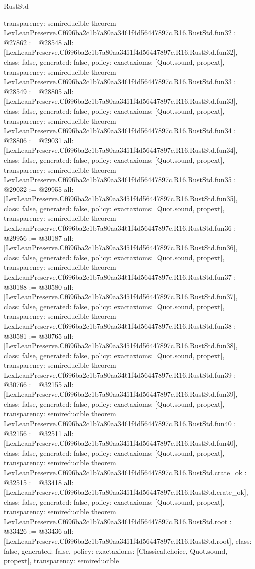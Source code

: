 \begin{lexlean}{RustStd}
\begin{coremodule}
{  transparency: semireducible
}
theorem LexLeanPreserve.Cf696ba2c1b7a80aa3461f4d56447897c.R16.RustStd.fun32 : @27862 := @28548 {
  all: [LexLeanPreserve.Cf696ba2c1b7a80aa3461f4d56447897c.R16.RustStd.fun32],
  class: false,
  generated: false,
  policy: exact{axioms: [Quot.sound, propext]},
  transparency: semireducible
}
theorem LexLeanPreserve.Cf696ba2c1b7a80aa3461f4d56447897c.R16.RustStd.fun33 : @28549 := @28805 {
  all: [LexLeanPreserve.Cf696ba2c1b7a80aa3461f4d56447897c.R16.RustStd.fun33],
  class: false,
  generated: false,
  policy: exact{axioms: [Quot.sound, propext]},
  transparency: semireducible
}
theorem LexLeanPreserve.Cf696ba2c1b7a80aa3461f4d56447897c.R16.RustStd.fun34 : @28806 := @29031 {
  all: [LexLeanPreserve.Cf696ba2c1b7a80aa3461f4d56447897c.R16.RustStd.fun34],
  class: false,
  generated: false,
  policy: exact{axioms: [Quot.sound, propext]},
  transparency: semireducible
}
theorem LexLeanPreserve.Cf696ba2c1b7a80aa3461f4d56447897c.R16.RustStd.fun35 : @29032 := @29955 {
  all: [LexLeanPreserve.Cf696ba2c1b7a80aa3461f4d56447897c.R16.RustStd.fun35],
  class: false,
  generated: false,
  policy: exact{axioms: [Quot.sound, propext]},
  transparency: semireducible
}
theorem LexLeanPreserve.Cf696ba2c1b7a80aa3461f4d56447897c.R16.RustStd.fun36 : @29956 := @30187 {
  all: [LexLeanPreserve.Cf696ba2c1b7a80aa3461f4d56447897c.R16.RustStd.fun36],
  class: false,
  generated: false,
  policy: exact{axioms: [Quot.sound, propext]},
  transparency: semireducible
}
theorem LexLeanPreserve.Cf696ba2c1b7a80aa3461f4d56447897c.R16.RustStd.fun37 : @30188 := @30580 {
  all: [LexLeanPreserve.Cf696ba2c1b7a80aa3461f4d56447897c.R16.RustStd.fun37],
  class: false,
  generated: false,
  policy: exact{axioms: [Quot.sound, propext]},
  transparency: semireducible
}
theorem LexLeanPreserve.Cf696ba2c1b7a80aa3461f4d56447897c.R16.RustStd.fun38 : @30581 := @30765 {
  all: [LexLeanPreserve.Cf696ba2c1b7a80aa3461f4d56447897c.R16.RustStd.fun38],
  class: false,
  generated: false,
  policy: exact{axioms: [Quot.sound, propext]},
  transparency: semireducible
}
theorem LexLeanPreserve.Cf696ba2c1b7a80aa3461f4d56447897c.R16.RustStd.fun39 : @30766 := @32155 {
  all: [LexLeanPreserve.Cf696ba2c1b7a80aa3461f4d56447897c.R16.RustStd.fun39],
  class: false,
  generated: false,
  policy: exact{axioms: [Quot.sound, propext]},
  transparency: semireducible
}
theorem LexLeanPreserve.Cf696ba2c1b7a80aa3461f4d56447897c.R16.RustStd.fun40 : @32156 := @32511 {
  all: [LexLeanPreserve.Cf696ba2c1b7a80aa3461f4d56447897c.R16.RustStd.fun40],
  class: false,
  generated: false,
  policy: exact{axioms: [Quot.sound, propext]},
  transparency: semireducible
}
theorem LexLeanPreserve.Cf696ba2c1b7a80aa3461f4d56447897c.R16.RustStd.crate_ok : @32515 := @33418 {
  all: [LexLeanPreserve.Cf696ba2c1b7a80aa3461f4d56447897c.R16.RustStd.crate_ok],
  class: false,
  generated: false,
  policy: exact{axioms: [Quot.sound, propext]},
  transparency: semireducible
}
theorem LexLeanPreserve.Cf696ba2c1b7a80aa3461f4d56447897c.R16.RustStd.root : @33426 := @33436 {
  all: [LexLeanPreserve.Cf696ba2c1b7a80aa3461f4d56447897c.R16.RustStd.root],
  class: false,
  generated: false,
  policy: exact{axioms: [Classical.choice, Quot.sound, propext]},
  transparency: semireducible
}


\end{coremodule}
\end{lexlean}
